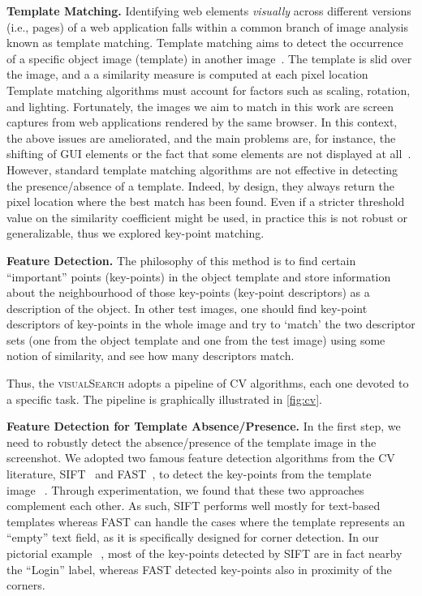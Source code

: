 \noindent
\textbf{Template Matching.}\label{sec:tm}
Identifying web elements \textit{visually} across different versions (i.e., pages) of a web application falls within a common branch of image analysis known as template matching. 
%
Template matching aims to detect the occurrence of a specific  object image (template) in another image~\cite{Brunelli:2009:TMT:1643435}. The template is slid over the image, and a a similarity measure is computed at each pixel location
%
Template matching algorithms must account for factors such as scaling, rotation, and lighting. Fortunately, the images we aim to match in this work are screen captures from web applications rendered by the same browser. In this context, the above issues are ameliorated, and the main problems are, for instance, the shifting of GUI elements or the fact that some elements are not displayed at all~\cite{}.
% 
However, standard template matching algorithms are not effective in detecting the presence/absence of a template. Indeed, by design, they always return the pixel location where the best match has been found. Even if a stricter threshold value on the similarity coefficient might be used, in practice this is not robust or generalizable, thus we explored key-point matching.

\noindent
\textbf{Feature Detection.}
The philosophy of this method is to find certain ``important'' points (key-points) in the object template and store information about the neighbourhood of those key-points (key-point descriptors) as a description of the object. In other test images, one should find key-point descriptors of key-points in the whole image and try to `match' the two descriptor sets (one from the object template and one from the test image) using some notion of similarity, and see how many descriptors match.

Thus, the \textsc{visualSearch} adopts a pipeline of CV algorithms, each one devoted to a specific task. The pipeline is graphically illustrated in \autoref{fig:cv}. 

\noindent
\textbf{Feature Detection for Template Absence/Presence.}
In the first step, we need to robustly detect the absence/presence of the template image in the screenshot.
We adopted two famous feature detection algorithms from the CV literature, SIFT~\cite{Lowe1999,Lowe2004} and FAST~\cite{rosten2005tracking,rosten2008faster}, to detect the key-points from the template image~\textcircled{}. Through experimentation, we found that these two approaches complement each other. As such, SIFT performs well mostly for text-based templates whereas FAST can handle the cases where the template represents an ``empty'' text field, as it is specifically designed for corner detection. In our pictorial example~\textcircled{}, most of the key-points detected by SIFT are in fact nearby the ``Login'' label, whereas FAST detected key-points also in proximity of the corners.
 
